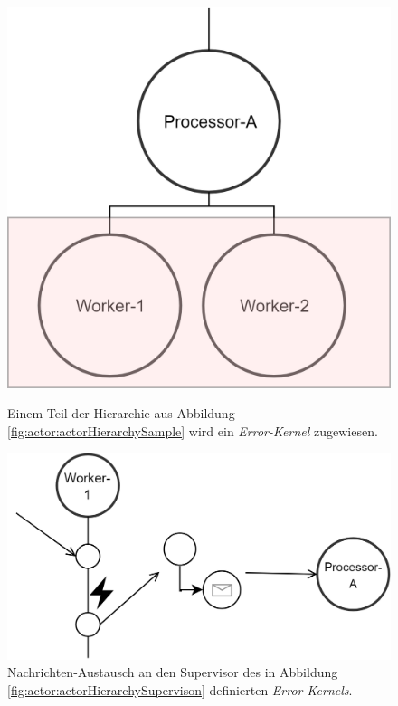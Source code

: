 \begin{figure}
  \centering
  \begin{minipage}{.4\textwidth}
    \centering
    \includegraphics[width=\linewidth]{gfx/actor/actorHierchyErrorKernel}
    \caption{Einem Teil der Hierarchie aus Abbildung \ref{fig:actor:actorHierarchySample} wird ein \textit{Error-Kernel} zugewiesen.}
    \label{fig:actor:actorHierarchySupervison}    
  \end{minipage}%
  \begin{minipage}{.1\textwidth}
  \end{minipage}%
  \begin{minipage}{.5\textwidth}
   \centering
   \includegraphics[width=\linewidth]{gfx/actor/actorSupervisionMessageExample}
   \caption{Nachrichten-Austausch an den Supervisor des in Abbildung \ref{fig:actor:actorHierarchySupervison} definierten \textit{Error-Kernels}.}
   \label{fig:actor:actorHierarchySupervisonMessaging}
  \end{minipage}
\end{figure} 

